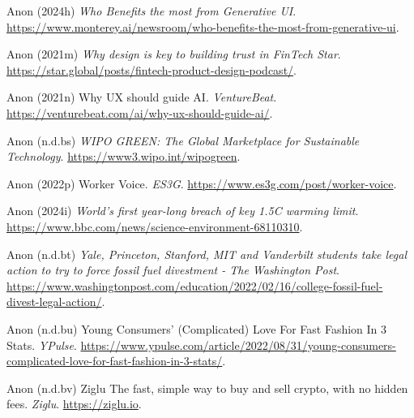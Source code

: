 \documentclass[
  letterpaper,
  DIV=11,
  numbers=noendperiod]{scrartcl}
\newlength{\cslhangindent}
\newenvironment{CSLReferences}[2] %
 {\begin{list}{}{%
  \setlength{\itemindent}{0pt}
  \setlength{\leftmargin}{0pt}
  \setlength{\parsep}{0pt}
  \ifodd #1
   \setlength{\leftmargin}{\cslhangindent}
   \setlength{\itemindent}{-1\cslhangindent}
  \fi
  \setlength{\itemsep}{#2\baselineskip}}}
 {\end{list}}
\begin{document}
\begin{CSLReferences}{0}{1}
Anon (2024h) \emph{Who {Benefits} the most from {Generative UI}}.
\url{https://www.monterey.ai/newsroom/who-benefits-the-most-from-generative-ui}.

Anon (2021m) \emph{Why design is key to building trust in {FinTech}
{\textbar} {Star}}.
\url{https://star.global/posts/fintech-product-design-podcast/}.

Anon (2021n) Why {UX} should guide {AI}. \emph{VentureBeat}.
\url{https://venturebeat.com/ai/why-ux-should-guide-ai/}.

Anon (n.d.bs) \emph{{WIPO GREEN}: {The Global Marketplace} for
{Sustainable Technology}}. \url{https://www3.wipo.int/wipogreen}.

Anon (2022p) Worker {Voice}. \emph{ES3G}.
\url{https://www.es3g.com/post/worker-voice}.

Anon (2024i) \emph{World's first year-long breach of key 1.{5C} warming
limit}. \url{https://www.bbc.com/news/science-environment-68110310}.

Anon (n.d.bt) \emph{Yale, {Princeton}, {Stanford}, {MIT} and
{Vanderbilt} students take legal action to try to force fossil fuel
divestment - {The Washington Post}}.
\url{https://www.washingtonpost.com/education/2022/02/16/college-fossil-fuel-divest-legal-action/}.

Anon (n.d.bu) Young {Consumers}' ({Complicated}) {Love For Fast Fashion
In} 3 {Stats}. \emph{YPulse}.
\url{https://www.ypulse.com/article/2022/08/31/young-consumers-complicated-love-for-fast-fashion-in-3-stats/}.

Anon (n.d.bv) Ziglu {\textbar} {The} fast, simple way to buy and sell
crypto, with no hidden fees. \emph{Ziglu}. \url{https://ziglu.io}.


\end{CSLReferences}
\end{document}
